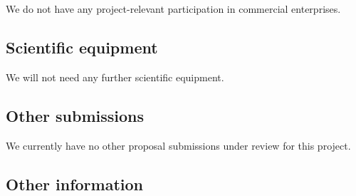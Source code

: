 We do not have any project-relevant participation in commercial enterprises.  

\subsection{Scientific equipment}

We will not need any further scientific equipment. 

\subsection{Other submissions}

We currently have no other proposal submissions under review for this project.  

\subsection{Other information}
